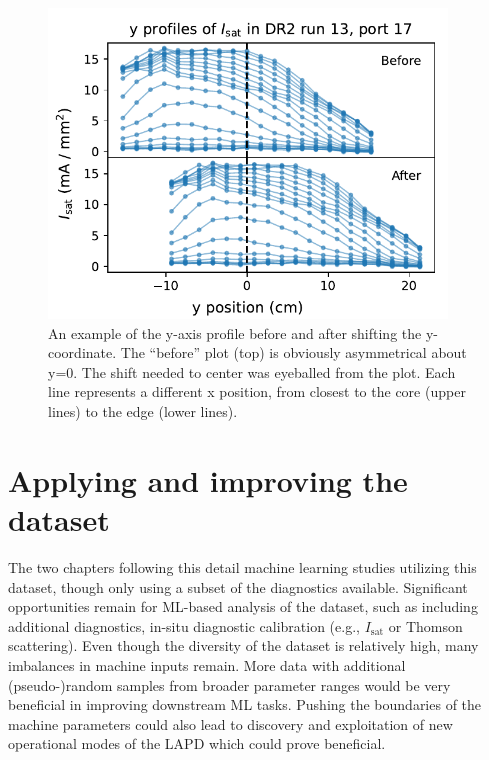 \begin{figure}
	\centering
	\includegraphics[width=300pt]{figures/y-alignment_before-after.pdf}
	\caption[y-axis profile before and after shifting the y-coordinate]{\label{fig:y-alignment_before-after}An example of the y-axis profile before and after shifting the y-coordinate. The ``before'' plot (top) is obviously asymmetrical about y=0. The shift needed to center was eyeballed from the plot. Each line represents a different x position, from closest to the core (upper lines) to the edge (lower lines).}
\end{figure}

\section{Applying and improving the dataset}

The two chapters following this detail machine learning studies utilizing this dataset, though only using a subset of the diagnostics available. Significant opportunities remain for ML-based analysis of the dataset, such as including additional diagnostics, in-situ diagnostic calibration (e.g., $I_\text{sat}$ or Thomson scattering). Even though the diversity of the dataset is relatively high, many imbalances in machine inputs remain. More data with additional (pseudo-)random samples from broader parameter ranges would be very beneficial in improving downstream ML tasks. Pushing the boundaries of the machine parameters could also lead to discovery and exploitation of new operational modes of the LAPD which could prove beneficial.

